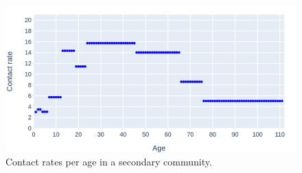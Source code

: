 \begin{figure}
    \centering
    \includegraphics[width=.8\textwidth]{3 - Stride/fig/secondary_contact_rates.png}
    \caption{Contact rates per age in a secondary community.}
    \label{fig:secondary_contact_rates}
\end{figure}


